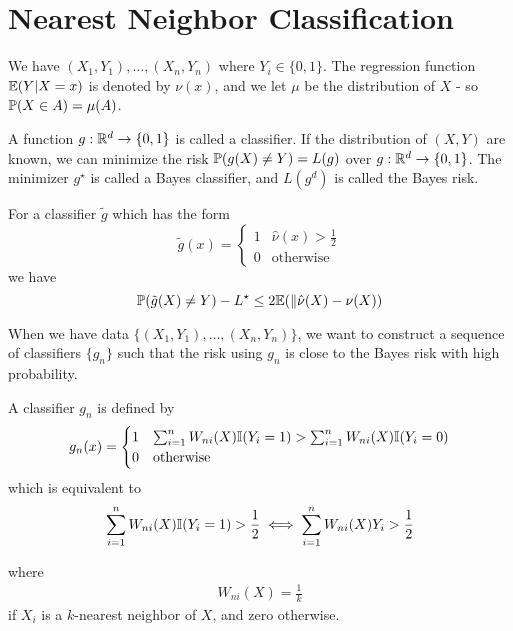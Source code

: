 
\chapter{Nearest Neighbor Classification}
\label{cha:near-neighb-class}

We have $(X_{1}, Y_{1}), \dots, (X_{n}, Y_{n})$ where $Y_{i} \in \{ 0,
1 \}$.  The regression function $\E{Y | X = x}$ is denoted by
$\nu(x)$, and we let $\mu$ be the distribution of $X$ - so $\Prob{X
  \in A} = \mu(A)$.

A function $g: \mathbb{R}^{d} \rightarrow \{ 0, 1 \}$ is called a classifier.
If the distribution of $(X, Y)$ are known, we can minimize the risk
$\Prob{g(X) \neq Y} = L(g)$ over $g: \mathbb{R}^{d} \rightarrow \{ 0, 1 \}$.
The minimizer $g^{\star}$ is called a Bayes classifier, and $L(g^{d})$
is called the Bayes risk.

\begin{lem}
  For a classifier $\tilde g$ which has the form
  \begin{equation}
    \label{eq:90}
    \tilde g(x) =
    \begin{cases}
      1 & \hat \nu(x) > \frac{1}{2} \\
      0 & \text{otherwise}
    \end{cases}
  \end{equation} we have
  \begin{equation}
    \label{eq:93}
    \Prob{\tilde g(X) \neq Y} - L^{\star} \leq 2 \E{\| \hat \nu(X) - \nu(X)}
  \end{equation}
\end{lem}

When we have data $\{ (X_{1}, Y_{1}), \dots, (X_{n}, Y_{n}) \}$, we
want to construct a sequence of classifiers $\{ g_{n} \}$ such that
the risk using $g_{n}$ is close to the Bayes risk with high
probability.

\begin{defn}
  \label{defn:nearest_neighbour_classification:1}
  A \knn classifier $g_{n}$ is defined by
  \begin{align}
    \label{eq:94}
    g_{n}(x) =
    \begin{cases}
      1 & \sum_{i=1}^{n} W_{ni}(X) \I{Y_{i} = 1} > \sum_{i=1}^{n}
      W_{ni}(X) \I{Y_{i} = 0} \\
      0 & \text{otherwise}
    \end{cases}
  \end{align}
  which is equivalent to
  \begin{align}
    \label{eq:96}
    \sum_{i=1}^{n} W_{ni}(X) \I{Y_{i} = 1} > \frac{1}{2} \iff
    \sum_{i=1}^{n} W_{ni}(X) Y_{i} > \frac{1}{2}
  \end{align}
  
  where
  \begin{align}
    \label{eq:95}
    W_{ni}(X) = \frac{1}{k} 
  \end{align} if $X_{i}$ is a $k$-nearest neighbor of $X$, and zero otherwise.
\end{defn}

